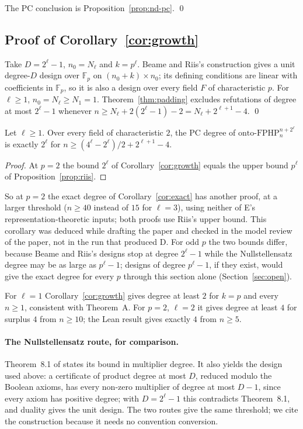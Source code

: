 The PC conclusion is Proposition~\ref{prop:nd-pc}.  \qed

\subsection{Proof of Corollary~\ref{cor:growth}}\label{sec:growth-cor}

Take $D=2^\ell-1$, $n_0=N_\ell$ and $k=p^\ell$.  Beame and Riis's construction gives a unit
degree-$D$ design over $\mathbb F_p$ on $(n_0+k)\times n_0$; its defining conditions are
linear with coefficients in $\mathbb F_p$, so it is also a design over every field $F$ of
characteristic $p$.  For $\ell\ge1$, $n_0=N_\ell\ge N_1=1$.  Theorem~\ref{thm:padding}
excludes refutations of degree at most $2^\ell-1$ whenever
$n\ge N_\ell+2(2^\ell-1)-2=N_\ell+2^{\ell+1}-4$.  \qed

\begin{corollary}[exact degree at $p=2$, without E's inputs]\label{cor:growth-p2}
Let $\ell\ge1$.  Over every field of characteristic $2$, the PC degree of
$\mathrm{onto\text{-}FPHP}^{n+2^\ell}_n$ is exactly $2^\ell$ for
$n\ge(4^\ell-2^\ell)/2+2^{\ell+1}-4$.
\end{corollary}

\begin{proof}
At $p=2$ the bound $2^\ell$ of Corollary~\ref{cor:growth} equals the upper bound $p^\ell$ of
Proposition~\ref{prop:riis}.
\end{proof}

So at $p=2$ the exact degree of Corollary~\ref{cor:exact} has another proof, at a larger
threshold ($n\ge40$ instead of $15$ for $\ell=3$), using neither of E's
representation-theoretic inputs; both proofs use Riis's upper bound.  This corollary was
deduced while drafting the paper and checked in the model review of the paper, not in the
run that produced D.  For odd $p$ the two bounds differ, because Beame and Riis's designs stop at
degree $2^\ell-1$ while the Nullstellensatz degree may be as large as $p^\ell-1$; designs of
degree $p^\ell-1$, if they exist, would give the exact degree for every $p$ through this
section alone (Section~\ref{sec:open}).

For $\ell=1$ Corollary~\ref{cor:growth} gives degree at least $2$ for $k=p$ and every $n\ge1$, consistent with
Theorem~A.  For $p=2$, $\ell=2$ it gives degree at least $4$ for surplus $4$ from $n\ge10$;
the Lean result gives exactly $4$ from $n\ge5$.

\paragraph{The Nullstellensatz route, for comparison.}  Theorem~8.1 of
\cite{beame1998counting} states its bound in multiplier degree.  It also yields the
design used above: a certificate of product degree at most $D$, reduced modulo the Boolean
axioms, has every non-zero multiplier of degree at most $D-1$, since every axiom has positive
degree; with $D=2^\ell-1$ this contradicts Theorem~8.1, and duality gives the unit design.
The two routes give the same threshold; we cite the construction because it needs no
convention conversion.

